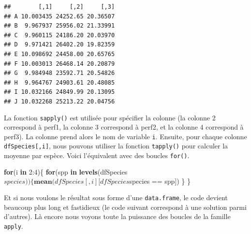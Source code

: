 \documentclass[twoside,symmetric]{book}
\newenvironment{Shaded}{}{}
\newcommand{\ControlFlowTok}[1]{\textbf{#1}}
\newcommand{\DecValTok}[1]{#1}
\newcommand{\KeywordTok}[1]{\textbf{#1}}
\newcommand{\NormalTok}[1]{#1}
\newcommand{\OperatorTok}[1]{#1}
\newcommand{\StringTok}[1]{#1}
\begin{document}
\begin{verbatim}
##        [,1]     [,2]     [,3]
## A 10.003435 24252.65 20.36507
## B  9.967937 25956.02 21.33991
## C  9.960115 24186.20 20.03970
## D  9.971421 26402.20 19.82359
## E 10.098692 24458.00 20.65765
## F 10.003013 26468.14 20.20879
## G  9.984948 23592.71 20.54826
## H  9.964767 24903.61 20.48085
## I 10.032166 24849.99 20.13095
## J 10.032268 25213.22 20.04756
\end{verbatim}

La fonction \texttt{sapply()} est utilisée pour spécifier la colonne (la colonne 2 correspond à perf1, la colonne 3 correspond à perf2, et la colonne 4 correspond à perf3). La colonne prend alors le nom de variable \texttt{i}. Ensuite, pour chaque colonne \texttt{dfSpecies{[},i{]}}, nous pouvons utiliser la fonction \texttt{tapply()} pour calculer la moyenne par espèce. Voici l'équivalent avec des boucles \texttt{for()}.

\begin{Shaded}
\begin{Highlighting}[]
\ControlFlowTok{for}\NormalTok{(i }\ControlFlowTok{in} \DecValTok{2}\OperatorTok{:}\DecValTok{4}\NormalTok{)\{}
  \ControlFlowTok{for}\NormalTok{(spp }\ControlFlowTok{in} \KeywordTok{levels}\NormalTok{(dfSpecies}\OperatorTok{$}\NormalTok{species))\{}
    \KeywordTok{mean}\NormalTok{(dfSpecies[,i][dfSpecies}\OperatorTok{$}\NormalTok{species }\OperatorTok{==}\StringTok{ }\NormalTok{spp])}
\NormalTok{  \}}
\NormalTok{\}}
\end{Highlighting}
\end{Shaded}

Et si nous voulons le résultat sous forme d'une \texttt{data.frame}, le code devient beaucoup plus long et fastidieux (le code suivant correspond à une solution parmi d'autres). Là encore nous voyons toute la puissance des boucles de la famille \texttt{apply}.
\end{document}
